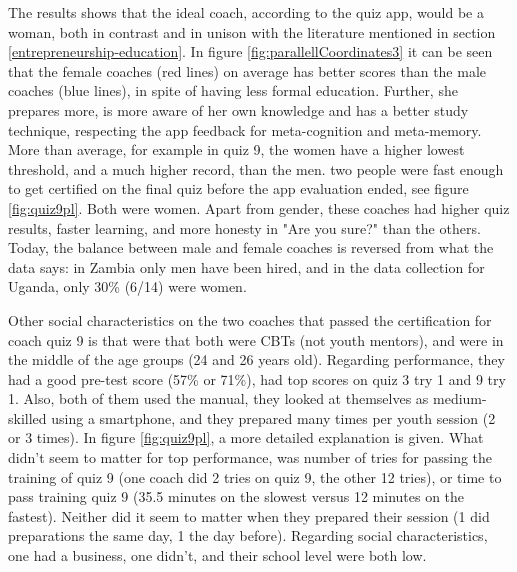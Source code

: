The results shows that the ideal coach, according to the quiz app, would be a woman, both in contrast and in unison with the literature mentioned in section \ref{entrepreneurship-education}. In figure \ref{fig:parallellCoordinates3} it can be seen that the female coaches (red lines) on average has better scores than the male coaches (blue lines), in spite of having less formal education. Further, she prepares more, is more aware of her own knowledge and has a better study technique, respecting the app feedback for meta-cognition and meta-memory. More than average, for example in quiz 9, the women have a higher lowest threshold, and a much higher record, than the men. two people were fast enough to get certified on the final quiz before the app evaluation ended, see figure \ref{fig:quiz9pl}. Both were women. Apart from gender, these coaches had higher quiz results, faster learning, and more honesty in "Are you sure?" than the others. Today, the balance between male and female coaches is reversed from what the data says: in Zambia only men have been hired, and in the data collection for Uganda, only 30\% (6/14) were women.

Other social characteristics on the two coaches that passed the certification for coach quiz 9 is that were that both were CBTs (not youth mentors), and were in the middle of the age groups (24 and 26 years old). Regarding performance, they had a good pre-test score (57\% or 71\%), had top scores on quiz 3 try 1 and 9 try 1. Also, both of them used the manual, they looked at themselves as medium-skilled using a smartphone, and they prepared many times per youth session (2 or 3 times). In figure \ref{fig:quiz9pl}, a more detailed explanation is given. What didn't seem to matter for top performance, was number of tries for passing the training of quiz 9 (one coach did 2 tries on quiz 9, the other 12 tries), or time to pass training quiz 9 (35.5 minutes on the slowest versus 12 minutes on the fastest). Neither did it seem to matter when they prepared their session (1 did preparations the same day, 1 the day before). Regarding social characteristics, one had a business, one didn't, and their school level were both low.

